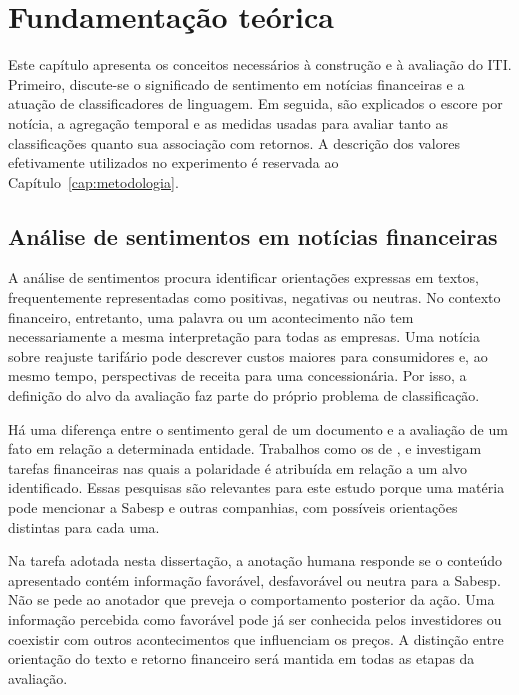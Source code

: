 \chapter{Fundamentação teórica}
\label{cap:fundamentacao}

Este capítulo apresenta os conceitos necessários à construção e à avaliação do ITI. Primeiro, discute-se o significado de sentimento em notícias financeiras e a atuação de classificadores de linguagem. Em seguida, são explicados o escore por notícia, a agregação temporal e as medidas usadas para avaliar tanto as classificações quanto sua associação com retornos. A descrição dos valores efetivamente utilizados no experimento é reservada ao Capítulo~\ref{cap:metodologia}.

\section{Análise de sentimentos em notícias financeiras}

A análise de sentimentos procura identificar orientações expressas em textos, frequentemente representadas como positivas, negativas ou neutras. No contexto financeiro, entretanto, uma palavra ou um acontecimento não tem necessariamente a mesma interpretação para todas as empresas. Uma notícia sobre reajuste tarifário pode descrever custos maiores para consumidores e, ao mesmo tempo, perspectivas de receita para uma concessionária. Por isso, a definição do alvo da avaliação faz parte do próprio problema de classificação.

Há uma diferença entre o sentimento geral de um documento e a avaliação de um fato em relação a determinada entidade. Trabalhos como os de ,  e  investigam tarefas financeiras nas quais a polaridade é atribuída em relação a um alvo identificado. Essas pesquisas são relevantes para este estudo porque uma matéria pode mencionar a Sabesp e outras companhias, com possíveis orientações distintas para cada uma.

Na tarefa adotada nesta dissertação, a anotação humana responde se o conteúdo apresentado contém informação favorável, desfavorável ou neutra para a Sabesp. Não se pede ao anotador que preveja o comportamento posterior da ação. Uma informação percebida como favorável pode já ser conhecida pelos investidores ou coexistir com outros acontecimentos que influenciam os preços. A distinção entre orientação do texto e retorno financeiro será mantida em todas as etapas da avaliação.

